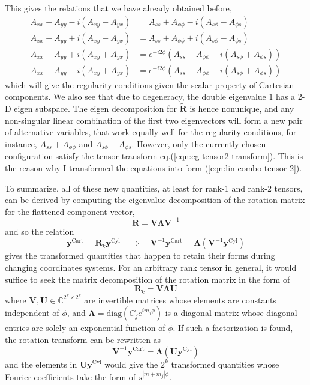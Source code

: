 This gives the relations that we have already obtained before,
\begin{equation}
\begin{aligned}
    A_{xx} + A_{yy} - i(A_{xy} - A_{yx}) &= A_{ss} + A_{\phi\phi} - i (A_{s\phi} - A_{\phi s}) \\ 
    A_{xx} + A_{yy} + i(A_{xy} - A_{yx}) &= A_{ss} + A_{\phi\phi} + i (A_{s\phi} - A_{\phi s}) \\ 
    A_{xx} - A_{yy} + i(A_{xy} + A_{yx}) &= e^{+i2\phi} \left(A_{ss} - A_{\phi\phi} + i (A_{s\phi} + A_{\phi s})\right) \\ 
    A_{xx} - A_{yy} - i(A_{xy} + A_{yx}) &= e^{-i2\phi} \left(A_{ss} - A_{\phi\phi} - i (A_{s\phi} + A_{\phi s})\right)
\end{aligned}
\end{equation}
which will give the regularity conditions given the scalar property of Cartesian components. We also see that due to degeneracy, the double eigenvalue $1$ has a 2-D eigen subspace. The eigen decomposition for $\tilde{\mathbf{R}}$ is hence nonunique, and any non-singular linear combination of the first two eigenvectors will form a new pair of alternative variables, that work equally well for the regularity conditions, for instance, $A_{ss} + A_{\phi\phi}$ and $A_{s\phi} - A_{\phi s}$. However, only the currently chosen configuration satisfy the tensor transform eq.(\ref{eqn:cg-tensor2-transform}). This is the reason why I transformed the equations into form (\ref{eqn:lin-combo-tensor-2}).

To summarize, all of these new quantities, at least for rank-1 and rank-2 tensors, can be derived by computing the eigenvalue decomposition of the rotation matrix for the flattened component vector,
\[\mathbf{R} = \mathbf{V} \bm{\Lambda} \mathbf{V}^{-1}\]
and so the relation
\[\mathbf{y}^{\mathrm{Cart}} = \mathbf{R}_k \mathbf{y}^{\mathrm{Cyl}} \quad \Longrightarrow \quad \mathbf{V}^{-1} \mathbf{y}^{\mathrm{Cart}} = \bm{\Lambda} \left(\mathbf{V}^{-1} \mathbf{y}^{\mathrm{Cyl}}\right)
\]
gives the transformed quantities that happen to retain their forms during changing coordinates systems.
For an arbitrary rank tensor in general, it would suffice to seek the matrix decomposition of the rotation matrix in the form of
\begin{equation}
    \mathbf{R}_k = \mathbf{V} \bm{\Lambda} \mathbf{U}
\end{equation}
where $\mathbf{V}, \mathbf{U} \in \mathbb{C}^{2^k\times 2^k}$ are invertible matrices whose elements are constants independent of $\phi$, and $\bm{\Lambda} = \mathrm{diag}\left(C_j e^{i m_j \phi}\right)$ is a diagonal matrix whose diagonal entries are solely an exponential function of $\phi$.
If such a factorization is found, the rotation transform can be rewritten as
\begin{equation}
    \mathbf{V}^{-1} \mathbf{y}^\mathrm{Cart} = \bm{\Lambda} \left(\mathbf{U} \mathbf{y}^\mathrm{Cyl}\right)
\end{equation}
and the elements in $\mathbf{U} \mathbf{y}^\mathrm{Cyl}$ would give the $2^k$ transformed quantities whose Fourier coefficients take the form of $s^{|m+m_j|\phi}$.


